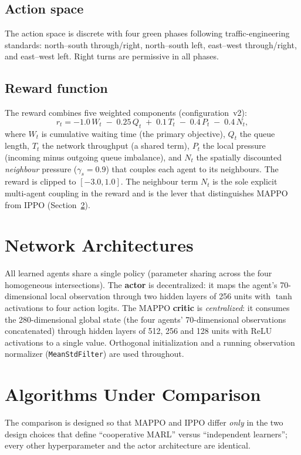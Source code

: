 \subsection{Action space}
The action space is discrete with four green phases following traffic-engineering
standards: north--south through/right, north--south left, east--west
through/right, and east--west left. Right turns are permissive in all phases.

\subsection{Reward function}
The reward combines five weighted components (configuration~v2):
\begin{equation}
r_t = -1.0\,W_t \;-\; 0.25\,Q_t \;+\; 0.1\,T_t \;-\; 0.4\,P_t \;-\; 0.4\,N_t,
\end{equation}
where $W_t$ is cumulative waiting time (the primary objective), $Q_t$ the queue
length, $T_t$ the network throughput (a shared term), $P_t$ the local pressure
(incoming minus outgoing queue imbalance), and $N_t$ the spatially discounted
\emph{neighbour} pressure ($\gamma_s = 0.9$) that couples each agent to its
neighbours. The reward is clipped to $[-3.0, 1.0]$. The neighbour term $N_t$ is the
sole explicit multi-agent coupling in the reward and is the lever that
distinguishes MAPPO from IPPO (Section~\ref{sec:algos}).

\section{Network Architectures}
All learned agents share a single policy (parameter sharing across the four
homogeneous intersections). The \textbf{actor} is decentralized: it maps the
agent's 70-dimensional local observation through two hidden layers of 256 units
with $\tanh$ activations to four action logits. The MAPPO \textbf{critic} is
\emph{centralized}: it consumes the 280-dimensional global state (the four agents'
70-dimensional observations concatenated) through hidden layers of 512, 256 and 128
units with ReLU activations to a single value. Orthogonal initialization and a
running observation normalizer (\texttt{MeanStdFilter}) are used throughout.

\section{Algorithms Under Comparison}
\label{sec:algos}
The comparison is designed so that MAPPO and IPPO differ \emph{only} in the two
design choices that define ``cooperative MARL'' versus ``independent learners'';
every other hyperparameter and the actor architecture are identical.

